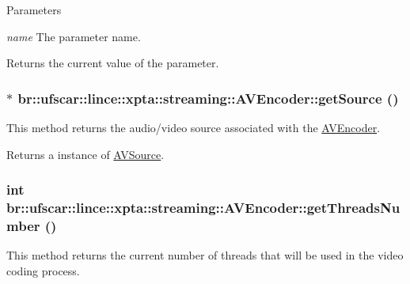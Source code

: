 \begin{DoxyParams}{Parameters}
\item[{\em name}]The parameter name. \end{DoxyParams}
\begin{DoxyReturn}{Returns}
the current value of the parameter. 
\end{DoxyReturn}
\hypertarget{classbr_1_1ufscar_1_1lince_1_1xpta_1_1streaming_1_1AVEncoder_a63118f2d7a9b3631eceb04cbd9a59eb1}{
\subsubsection[{getSource}]{$\ast$ br::ufscar::lince::xpta::streaming::AVEncoder::getSource ()}}
\label{classbr_1_1ufscar_1_1lince_1_1xpta_1_1streaming_1_1AVEncoder_a63118f2d7a9b3631eceb04cbd9a59eb1}


This method returns the audio/video source associated with the \hyperlink{classbr_1_1ufscar_1_1lince_1_1xpta_1_1streaming_1_1AVEncoder}{AVEncoder}. 

\begin{DoxyReturn}{Returns}
a instance of \hyperlink{classbr_1_1ufscar_1_1lince_1_1xpta_1_1streaming_1_1AVSource}{AVSource}. 
\end{DoxyReturn}
\hypertarget{classbr_1_1ufscar_1_1lince_1_1xpta_1_1streaming_1_1AVEncoder_a335b684db9eabcb884a4d34772c2283c}{
\subsubsection[{getThreadsNumber}]{\setlength{\rightskip}{0pt plus 5cm}int br::ufscar::lince::xpta::streaming::AVEncoder::getThreadsNumber ()}}
\label{classbr_1_1ufscar_1_1lince_1_1xpta_1_1streaming_1_1AVEncoder_a335b684db9eabcb884a4d34772c2283c}


This method returns the current number of threads that will be used in the video coding process. 

